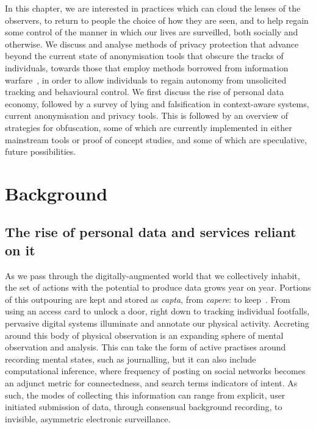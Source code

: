 \documentclass{IOS-Book-Article}     %
\begin{document}
In this chapter, we are interested in practices which can cloud the lenses of the observers, to
return to people the choice of how they are seen, and to help regain some
control of
the manner in which our lives are surveilled, both socially and otherwise. 
We discuss and analyse methods of privacy protection that
advance beyond the current state of anonymisation tools that obscure the tracks
of individuals, towards those that employ methods borrowed from
information warfare~\cite{gursestranslating,lyon2007surveillance}, 
in order to allow individuals to regain autonomy
from unsolicited tracking and behavioural control.  We first discuss the rise of 
personal data economy, followed by a survey of lying and falsification in context-aware 
systems, current anonymisation and privacy tools. This is followed by an overview of
strategies for obfuscation, some of which are currently implemented in either
mainstream tools or proof of concept studies,  and some of which are
speculative, future possibilities.

\section{Background}

\subsection{The rise of personal data and services reliant on it}

As we pass through the digitally-augmented world that we collectively inhabit,
the set of actions with the potential to produce data grows year on year.
Portions of this outpouring are kept and stored as
\emph{capta}, from \emph{capere}: to keep~\cite{dodge2005codes}. From
using an access card to unlock a door, right down to tracking
individual footfalls, pervasive digital systems illuminate and annotate our
physical activity. Accreting around this body of physical observation is an
expanding sphere of mental observation and analysis. This can take the form of
active practises around recording mental states, such as journalling, but it can
also include computational inference, where frequency of posting on social
networks becomes an adjunct metric for connectedness, and search terms 
indicators of intent. As such, the modes of collecting this information can
range from explicit, user initiated submission of data, through consensual
background recording, to invisible, asymmetric electronic surveillance.
\end{document}
